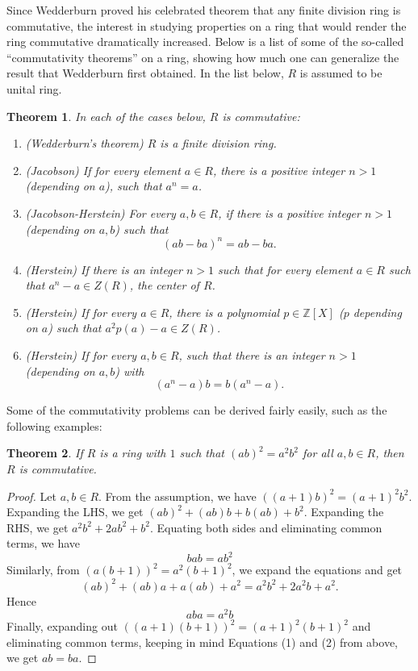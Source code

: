 \documentclass[12pt]{article}
\newtheorem{thm}{Theorem}
\begin{document}
Since Wedderburn proved his celebrated theorem that any finite division ring is commutative, the interest in studying properties on a ring that would render the ring commutative dramatically increased.  Below is a list of some of the so-called ``commutativity theorems'' on a ring, showing how much one can generalize the result that Wedderburn first obtained.  In the list below, $R$ is assumed to be unital ring.

\begin{thm} In each of the cases below, $R$ is commutative:
\begin{enumerate}
\item (Wedderburn's theorem)  $R$ is a finite division ring.
\item (Jacobson) If for every element $a\in R$, there is a positive integer $n>1$ (depending on $a$), such that $a^n=a$.
\item (Jacobson-Herstein)  For every $a,b\in R$, if there is a positive integer $n>1$ (depending on $a,b$) such that $$(ab-ba)^n=ab-ba.$$
\item (Herstein) If there is an integer $n>1$ such that for every element $a\in R$ such that $a^n-a\in Z(R)$, the center of $R$.
\item (Herstein) If for every $a\in R$, there is a polynomial $p\in \mathbb{Z}[X]$ ($p$ depending on $a$) such that $a^2p(a)-a\in Z(R)$.
\item (Herstein) If for every $a,b\in R$, such that there is an integer $n>1$ (depending on $a,b$) with $$(a^n-a)b=b(a^n-a).$$
\end{enumerate}
\end{thm}

Some of the commutativity problems can be derived fairly easily, such as the following examples:
\begin{thm}  If $R$ is a ring with $1$ such that $(ab)^2=a^2b^2$ for all $a,b\in R$, then $R$ is commutative.
\end{thm}
\begin{proof}
Let $a, b \in R$.  From the assumption, we have $((a+1)b)^2=(a+1)^2b^2$.  Expanding the LHS, we get $(ab)^2+(ab)b+
b(ab)+b^2$.  Expanding the RHS, we get $a^2b^2+2ab^2+b^2$.  Equating both sides and eliminating common terms, we have
\begin{equation}
bab=ab^2
\end{equation}
Similarly, from $(a(b+1))^2=a^2(b+1)^2$, we expand the equations and get $$(ab)^2+(ab)a+a(ab)+a^2=a^2b^2+2a^2b+a^2.$$
Hence
\begin{equation}
aba=a^2b
\end{equation}
Finally, expanding out $((a+1)(b+1))^2=(a+1)^2(b+1)^2$ and eliminating
common terms, keeping in mind Equations (1) and (2) from above, we get $ab=ba$.
\end{proof}
\end{document}
